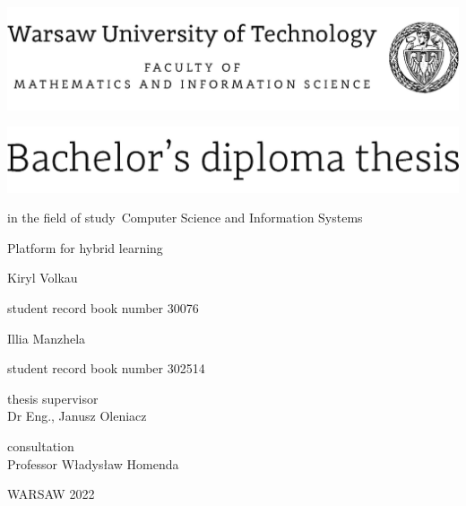 \documentclass[12pt,twoside,a4paper]{article}
\newcommand{\discipline}{Computer Science and Information Systems}
\renewcommand{\title}{Platform for hybrid learning }
\newcommand{\supervisor}{Dr Eng., Janusz Oleniacz}
\renewcommand{\year}{2022}
\newcommand{\authori}{Kiryl Volkau}
\newcommand{\albumi}{30076}
\newcommand{\authorii}{Illia Manzhela}
\newcommand{\albumii}{302514}
\begin{document}
\pagestyle{empty}


\begin{center}
\includegraphics[scale=1.]{img/wut}
\vspace{40pt}


\includegraphics[scale=1.]{img/bachelor} %

{ \arial
in the field of study~\discipline 

\vspace{30pt}
{\arial \large \title}


\vspace{40pt}

{\arial \huge \authori }

\vspace{5pt}

student record book number \albumi

\vspace {20pt}
{\arial \huge \authorii}

\vspace{5pt}

student record book number \albumii

\vspace{40pt}

thesis supervisor \\
{\arial \supervisor}

\vspace{15pt}
 
consultation  \\
{\arial Professor Władysław Homenda}

\vfill
 
WARSAW \year \\
}
\end{center}


%
%
\end{document}
